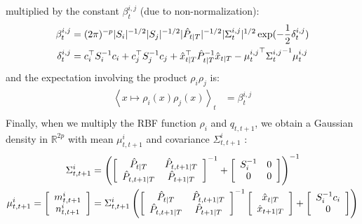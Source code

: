 multiplied by the constant $\beta^{i,j}_t$ (due to non-normalization):
\begin{align*}
  \beta^{i,j}_t &= (2\pi)^{-p} |S_i|^{-1/2} |S_j|^{-1/2} |\hat{P}_{t|T}|^{-1/2} |\Sigma^{i,j}_t|^{1/2} \exp(-\frac{1}{2} \delta^{i,j}_t)\\
  \delta^{i,j}_t &= c_i^{\top} S_i^{-1} c_i + c_j^{\top} S_j^{-1} c_j + \hat{x}_{t \mathbin{\vert} T}^{\top} \hat{P}_{t \mathbin{\vert} T}^{-1} \hat{x}_{t \mathbin{\vert} T} - {\mu^{i,j}_t}^{\top} {\Sigma^{i,j}_t}^{-1} \mu^{i,j}_t\\
\end{align*}
and the expectation involving the product $\rho_i \rho_j$ is:
\begin{align*}
  \left< x \mapsto \rho_i(x)\rho_j(x)\right>_{t} &= \beta^{i,j}_t\\
\end{align*}
Finally, when we multiply the RBF function $\rho_i$ and $q_{t,t+1}$, we obtain a Gaussian density in $\mathbb{R}^{2p}$ with mean $\mu^i_{t,t+1}$ and covariance $\Sigma^i_{t,t+1}$ :
\begin{align*}
  \Sigma^i_{t,t+1} &=
    \left(
      \left[
        \begin{array}{cc} \hat{P}_{t \mathbin{\vert} T} & \hat{P}_{t,t+1 \mathbin{\vert} T}\\ \hat{P}_{t,t+1 \mathbin{\vert} T} & \hat{P}_{t+1 \mathbin{\vert} T} \end{array}
      \right]^{-1}
       +
      \left[
        \begin{array}{cc} S_i^{-1} & 0\\ 0 & 0 \end{array}
      \right]
    \right)^{-1}
  \\
  \mu^i_{t,t+1} =
    \left[
      \begin{array}{c} m^i_{t,t+1} \\ n^i_{t,t+1} \end{array}
    \right]
    &=
    \Sigma^i_{t,t+1}
      \left(
        \left[
          \begin{array}{cc} \hat{P}_{t \mathbin{\vert} T} & \hat{P}_{t,t+1 \mathbin{\vert} T}\\ \hat{P}_{t,t+1 \mathbin{\vert} T} & \hat{P}_{t+1 \mathbin{\vert} T} \end{array}
        \right]^{-1}
        \left[
          \begin{array}{c} \hat{x}_{t \mathbin{\vert} T} \\ \hat{x}_{t+1 \mathbin{\vert} T} \end{array}
        \right] +
        \left[
          \begin{array}{c} S_i^{-1}c_i \\ 0 \end{array}
        \right]
      \right)
  \\
\end{align*}
